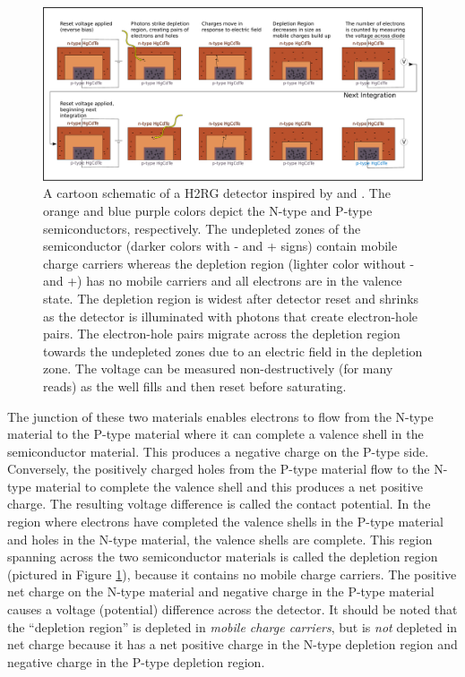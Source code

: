 \documentclass[]{aastex62}
\begin{document}
\begin{figure}[!hbtp]
\centering
\includegraphics[width=.99\columnwidth]{ideal_photodiode.pdf}
\caption{A cartoon schematic of a H2RG detector inspired by \citet{smith2008imgPersistence} and \citet{tulloch2018persistenceH2RG}.
The orange and blue purple colors depict the N-type and P-type semiconductors, respectively.
The undepleted zones of the semiconductor (darker colors with - and + signs) contain mobile charge carriers whereas the depletion region (lighter color without - and +) has no mobile carriers and all electrons are in the valence state.
The depletion region is widest after detector reset and shrinks as the detector is illuminated with photons that create electron-hole pairs.
The electron-hole pairs migrate across the depletion region towards the undepleted zones due to an electric field in the depletion zone.
The voltage can be measured non-destructively (for many reads) as the well fills and then reset before saturating.}\label{fig:npSchematic}
\end{figure}



The junction of these two materials enables electrons to flow from the N-type material to the P-type material where it can complete a valence shell in the semiconductor material.
This produces a negative charge on the P-type side.
Conversely, the positively charged holes from the P-type material flow to the N-type material to complete the valence shell and this produces a net positive charge.
The resulting voltage difference is called the contact potential.
In the region where electrons have completed the valence shells in the P-type material and holes in the N-type material, the valence shells are complete.
This region spanning across the two semiconductor materials is called the depletion region (pictured in Figure \ref{fig:npSchematic}), because it contains no mobile charge carriers.
The positive net charge on the N-type material and negative charge in the P-type material causes a voltage (potential) difference across the detector.
It should be noted that the ``depletion region'' is depleted in {\it mobile charge carriers}, but is {\it not} depleted in net charge because it has a net positive charge in the N-type depletion region and negative charge in the P-type depletion region.
\end{document}
